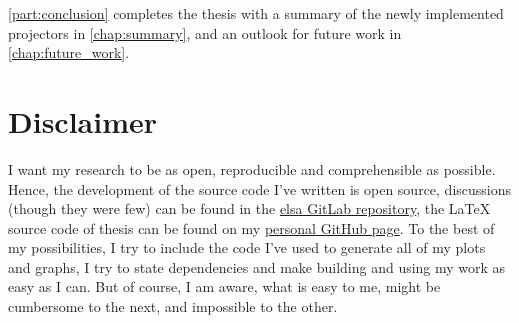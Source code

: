 \autoref{part:conclusion} completes the thesis with a summary of the newly implemented projectors in
\autoref{chap:summary}, and an outlook for future work in \autoref{chap:future_work}.

\section{Disclaimer}\label{sec:disclaimer}

I want my research to be as open, reproducible and comprehensible as possible. Hence, the
development of the source code I've written is open source, discussions (though they were few) can be
found in the \href{https://gitlab.lrz.de/IP/elsa}{elsa GitLab repository}, the \LaTeX{} source code
of thesis can be found on my
\href{https://github.com/ner0-m/ma-thesis-differential-basis-for-ct}{personal GitHub page}. To the
best of my possibilities, I try to include the code I've used to generate all of my plots and
graphs, I try to state dependencies and make building and using my work as easy as I can. But of
course, I am aware, what is easy to me, might be cumbersome to the next, and impossible to the
other.
